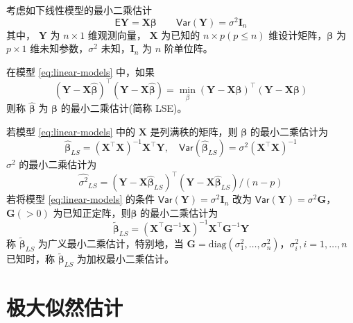 \documentclass[12pt,a4paper,UTF8,twoside]{book}
\theoremstyle{definition}
\theoremstyle{definition}
\theoremstyle{definition}
\theoremstyle{remark}
\let\BeginKnitrBlock\begin \let\EndKnitrBlock\end
\begin{document}
考虑如下线性模型的最小二乘估计
\begin{equation}
\mathsf{E}\mathbf{Y} = \mathbf{X}\boldsymbol{\beta} \qquad \mathsf{Var}(\mathbf{Y}) = \sigma^2 \mathbf{I}_{n} \label{eq:linear-models}
\end{equation}
\noindent 其中， \(\mathbf{Y}\) 为 \(n \times 1\) 维观测向量， \(\mathbf{X}\) 为已知的 \(n \times p (p \leq n)\) 维设计矩阵，\(\boldsymbol{\beta}\) 为 \(p \times 1\) 维未知参数，\(\sigma^2\) 未知，\(\mathbf{I}_{n}\) 为 \(n\) 阶单位阵。
\BeginKnitrBlock{definition}[最小二乘估计]
\protect\hypertarget{def:least-squares-estimate}{}{\label{def:least-squares-estimate} {} }在模型 \eqref{eq:linear-models} 中，如果
\begin{equation}
(\mathbf{Y} - \mathbf{X}\hat{\boldsymbol{\beta}})^{\top}(\mathbf{Y} - \mathbf{X}\hat{\boldsymbol{\beta}}) = \min_{\beta}(\mathbf{Y} - \mathbf{X}\boldsymbol{\beta})^{\top}(\mathbf{Y} - \mathbf{X}\boldsymbol{\beta}) \label{eq:least-squares}
\end{equation}
\noindent 则称 \(\hat{\boldsymbol{\beta}}\) 为 \(\boldsymbol{\beta}\) 的最小二乘估计(简称 LSE)\citep{wang2004}。
\EndKnitrBlock{definition}

\BeginKnitrBlock{theorem}[最小二乘估计]
\protect\hypertarget{thm:unbiased}{}{\label{thm:unbiased} {} }若模型 \eqref{eq:linear-models} 中的 \(\mathbf{X}\) 是列满秩的矩阵，则 \(\boldsymbol{\beta}\) 的最小二乘估计为
\[
\hat{\boldsymbol{\beta}}_{LS} = ( \mathbf{X}^{\top}\mathbf{X} )^{-1}\mathbf{X}^{\top} \mathbf{Y}, \quad  \mathsf{Var}(\hat{\boldsymbol{\beta}}_{LS}) = \sigma^2 (\mathbf{X}^{\top}\mathbf{X})^{-1}  
\]
\noindent \(\sigma^2\) 的最小二乘估计为
\[
\hat{\sigma^2}_{LS} = (\mathbf{Y} - \mathbf{X}\hat{\boldsymbol{\beta}}_{LS})^{\top}(\mathbf{Y} - \mathbf{X}\hat{\boldsymbol{\beta}}_{LS})/(n - p)
\]
若将模型 \eqref{eq:linear-models} 的条件 \(\mathsf{Var}(\mathbf{Y}) = \sigma^2 \mathbf{I}_{n}\) 改为 \(\mathsf{Var}(\mathbf{Y}) = \sigma^2 \mathbf{G}\)， \(\mathbf{G}(>0)\) 为已知正定阵，则\(\boldsymbol{\beta}\) 的最小二乘估计为
\[
\tilde{\boldsymbol{\beta}}_{LS} = ( \mathbf{X}^{\top} \mathbf{G}^{-1} \mathbf{X})^{-1} \mathbf{X}^{\top} \mathbf{G}^{-1} \mathbf{Y} 
\]
\noindent 称 \(\tilde{\boldsymbol{\beta}}_{LS}\) 为广义最小二乘估计，特别地，当 \(\mathbf{G} = \mathrm{diag}(\sigma^2_{1},\ldots,\sigma^2_{n})\)，\(\sigma^2_{i},i = 1,\ldots,n\) 已知时，称 \(\tilde{\boldsymbol{\beta}}_{LS}\) 为加权最小二乘估计\citep{wang2004}。
\EndKnitrBlock{theorem}

\hypertarget{sec:def-mle}{%
\section{极大似然估计}\label{sec:def-mle}}
\end{document}
